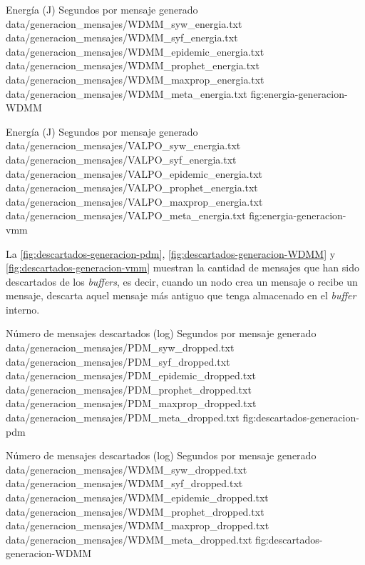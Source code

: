 {
\graficoProtocolos
{Energía (J)}
{Segundos por mensaje generado}
{data/generacion_mensajes/WDMM_syw_energia.txt}
{data/generacion_mensajes/WDMM_syf_energia.txt}
{data/generacion_mensajes/WDMM_epidemic_energia.txt}
{data/generacion_mensajes/WDMM_prophet_energia.txt}
{data/generacion_mensajes/WDMM_maxprop_energia.txt}
{data/generacion_mensajes/WDMM_meta_energia.txt}
}{fig:energia-generacion-WDMM}



{
\graficoProtocolos
{Energía (J)}
{Segundos por mensaje generado}
{data/generacion_mensajes/VALPO_syw_energia.txt}
{data/generacion_mensajes/VALPO_syf_energia.txt}
{data/generacion_mensajes/VALPO_epidemic_energia.txt}
{data/generacion_mensajes/VALPO_prophet_energia.txt}
{data/generacion_mensajes/VALPO_maxprop_energia.txt}
{data/generacion_mensajes/VALPO_meta_energia.txt}
}{fig:energia-generacion-vmm}


La \ref{fig:descartados-generacion-pdm}, \ref{fig:descartados-generacion-WDMM} y
\ref{fig:descartados-generacion-vmm} muestran la cantidad de mensajes que han
sido descartados de los \textit{buffers}, es decir, cuando un nodo crea un
mensaje o recibe un mensaje, descarta aquel mensaje más antiguo que tenga
almacenado en el \textit{buffer} interno.


{
\graficoProtocolosLog
{Número de mensajes descartados (log)}
{Segundos por mensaje generado} 
{data/generacion_mensajes/PDM_syw_dropped.txt}
{data/generacion_mensajes/PDM_syf_dropped.txt}
{data/generacion_mensajes/PDM_epidemic_dropped.txt}
{data/generacion_mensajes/PDM_prophet_dropped.txt}
{data/generacion_mensajes/PDM_maxprop_dropped.txt}
{data/generacion_mensajes/PDM_meta_dropped.txt}
}{fig:descartados-generacion-pdm}



{
\graficoProtocolosLog
{Número de mensajes descartados (log)}
{Segundos por mensaje generado}
{data/generacion_mensajes/WDMM_syw_dropped.txt}
{data/generacion_mensajes/WDMM_syf_dropped.txt}
{data/generacion_mensajes/WDMM_epidemic_dropped.txt}
{data/generacion_mensajes/WDMM_prophet_dropped.txt}
{data/generacion_mensajes/WDMM_maxprop_dropped.txt}
{data/generacion_mensajes/WDMM_meta_dropped.txt}
}{fig:descartados-generacion-WDMM}



